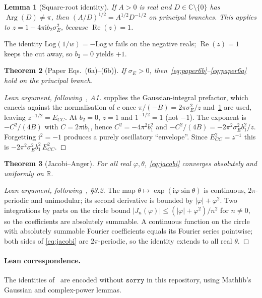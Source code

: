 \documentclass[11pt,a4paper]{article}
\newtheorem{theorem}{Theorem}[section]
\newtheorem{lemma}[theorem]{Lemma}
\theoremstyle{definition}
\theoremstyle{remark}
\DeclareMathOperator{\ReOp}{Re}
\DeclareMathOperator{\Arg}{Arg}
\newcommand{\R}{\mathbb{R}}
\newcommand{\C}{\mathbb{C}}
\newcommand{\ii}{\mathrm{i}}
\newcommand{\abs}[1]{\lvert#1\rvert}
\newcommand{\sE}{\sigma_E}
\newcommand{\ECC}{E_{CC}}
\begin{document}
\begin{lemma}[Square-root identity]
\label{lem:sqrt-div}
If $A>0$ is real and $D\in\C\setminus\{0\}$ has $\Arg(D)\neq\pi$, then
$(A/D)^{1/2}=A^{1/2}D^{-1/2}$ on principal branches.
This applies to $z=1-4\pi\ii b_2\sE^2$, because $\ReOp(z)=1$.
\end{lemma}
The identity $\mathrm{Log}(1/w)=-\mathrm{Log}\,w$ fails on the
negative reals; $\ReOp(z)=1$ keeps the cut away, so $b_2=0$ yields
$+1$.

\begin{theorem}[Paper Eqs.~(6a)--(6b)]
\label{thm:EC}
If $\sE>0$, then~\eqref{eq:paper6b}--\eqref{eq:paper6a} hold on the
principal branch.
\end{theorem}
\begin{proof}[Lean argument, following~\cite{Yu2019}, A1]
 supplies the Gaussian-integral prefactor, which
cancels against the normalisation of $c$ once $\pi/(-B)=2\pi\sE^2/z$
and~\cref{lem:sqrt-div} are used, leaving $z^{-1/2}=\ECC$.
At $b_2=0$, $z=1$ and $1^{-1/2}=1$ (not $-1$).
The exponent is $-C^2/(4B)$ with $C=2\pi\ii b_1$, hence
$C^2=-4\pi^2 b_1^2$ and $-C^2/(4B)=-2\pi^2\sE^2 b_1^2/z$.
Forgetting $\ii^2=-1$ produces a purely oscillatory ``envelope''.
Since $\ECC^2=z^{-1}$ this is $-2\pi^2\sE^2 b_1^2\,\ECC^2$.
\end{proof}

\begin{theorem}[Jacobi--Anger]
\label{thm:jacobi}
For all real $\varphi,\theta$, \eqref{eq:jacobi} converges absolutely
and uniformly on $\R$.
\end{theorem}
\begin{proof}[Lean argument, following~\cite{Yu2019}, \S3.2]
The map $\theta\mapsto\exp(\ii\varphi\sin\theta)$ is continuous,
$2\pi$-periodic and unimodular; its second derivative is bounded by
$\abs{\varphi}+\varphi^2$.
Two integrations by parts on the circle bound
$\abs{J_n(\varphi)}\le(\abs{\varphi}+\varphi^2)/n^2$ for $n\neq 0$,
so the coefficients are absolutely summable.
A continuous function on the circle with absolutely summable Fourier
coefficients equals its Fourier series pointwise; both sides of
\eqref{eq:jacobi} are $2\pi$-periodic, so the identity extends to all
real $\theta$.
\end{proof}

\paragraph{Lean correspondence.}
The identities of~\cite{Yu2019} are encoded without $\mathtt{sorry}$ in this
repository, using Mathlib's Gaussian and complex-power lemmas.
\end{document}
